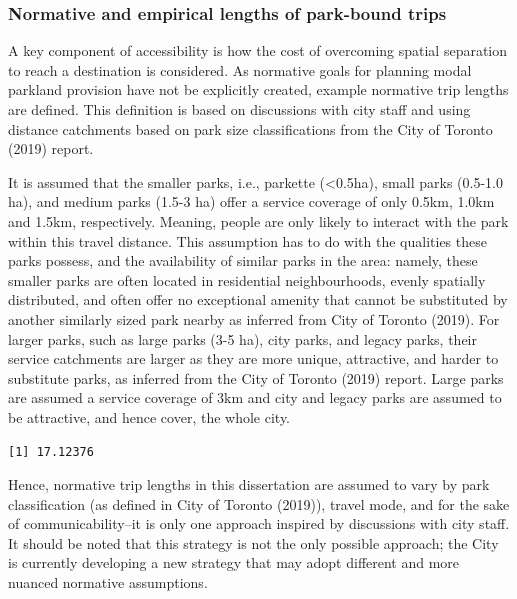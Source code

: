 \documentclass[
11pt, %
oneside, %
english, %
singlespacing, %
]{macthesis} %
\begin{document}
\subsubsection{Normative and empirical lengths of park-bound trips}\label{normative-and-empirical-lengths-of-park-bound-trips}

A key component of accessibility is how the cost of overcoming spatial separation to reach a destination is considered. As normative goals for planning modal parkland provision have not be explicitly created, example normative trip lengths are defined. This definition is based on discussions with city staff and using distance catchments based on park size classifications from the City of Toronto (2019) report.

It is assumed that the smaller parks, i.e., parkette (\textless0.5ha), small parks (0.5-1.0 ha), and medium parks (1.5-3 ha) offer a service coverage of only 0.5km, 1.0km and 1.5km, respectively. Meaning, people are only likely to interact with the park within this travel distance. This assumption has to do with the qualities these parks possess, and the availability of similar parks in the area: namely, these smaller parks are often located in residential neighbourhoods, evenly spatially distributed, and often offer no exceptional amenity that cannot be substituted by another similarly sized park nearby as inferred from City of Toronto (2019). For larger parks, such as large parks (3-5 ha), city parks, and legacy parks, their service catchments are larger as they are more unique, attractive, and harder to substitute parks, as inferred from the City of Toronto (2019) report. Large parks are assumed a service coverage of 3km and city and legacy parks are assumed to be attractive, and hence cover, the whole city.

\begin{verbatim}
[1] 17.12376
\end{verbatim}

Hence, normative trip lengths in this dissertation are assumed to vary by park classification (as defined in City of Toronto (2019)), travel mode, and for the sake of communicability--it is only one approach inspired by discussions with city staff. It should be noted that this strategy is not the only possible approach; the City is currently developing a new strategy that may adopt different and more nuanced normative assumptions.
\end{document}
